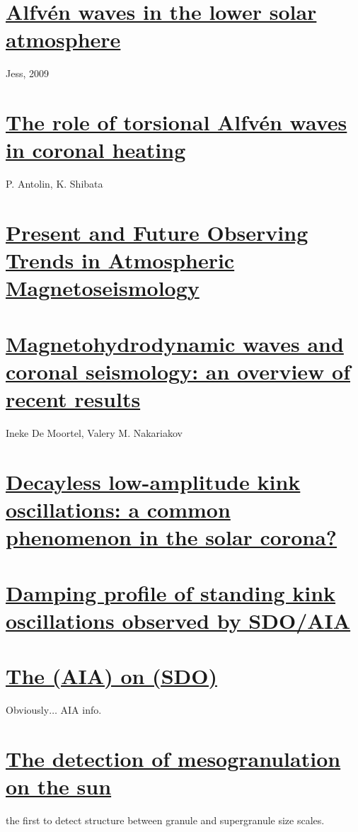 \documentclass{article}
\begin{document}
\section{%
    \href{http://arxiv.org/abs/0903.3546}
    {Alfv\'en waves in the lower solar atmosphere}}
    {Jess, 2009}

\section{%
    \href{https://arxiv.org/abs/0910.0962}
    {The role of torsional Alfv\'en waves in coronal heating}}
    {P. Antolin, K. Shibata}

\section{%
\href{http://link.springer.com/article/10.1007\%2Fs11207-007-9029-z}
{Present and Future Observing Trends in Atmospheric Magnetoseismology}}

\section{%
\href{http://rsta.royalsocietypublishing.org/content/370/1970/3193}
{Magnetohydrodynamic waves and coronal seismology: an overview of recent results}}
Ineke De Moortel, Valery M. Nakariakov

\section{%
\href{http://arxiv.org/abs/1509.05519}
{Decayless low-amplitude kink oscillations: a common phenomenon in the solar corona?}}

\section{%
\href{http://adsabs.harvard.edu/abs/2016A\%26A...585L...6P}
{Damping profile of standing kink oscillations observed by SDO/AIA}
}

\section{%
\href{http://cdsads.u-strasbg.fr/abs/2012SoPh..275...17L}
{The (AIA) on (SDO)}}
Obviously$\ldots$ AIA info.

\section{%
\href{http://adsabs.harvard.edu/abs/1981ApJ...245L.123N}
{The detection of mesogranulation on the sun}}
the first to detect structure between granule
and supergranule size scales.
\end{document}
